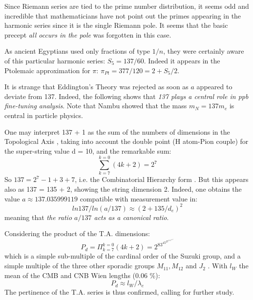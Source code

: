 \documentclass[twoside,draft]{article}
\begin{document}
\begin{sloppypar}
Since Riemann series are tied to the prime number distribution, it seems odd and incredible that mathematicians
have not point out the primes appearing in the harmonic series since it is the single Riemann pole. It seems
that the basic precept \textit{all occurs in the pole} was forgotten in this case. 

As ancient Egyptians used only fractions of type $1/n$, they were certainly aware of this particular harmonic series: 
$S_{5} = 137/60$. Indeed it appears in the Ptolemaic approximation for $\pi$: $\pi_{Pt} = 377/120 = 2 +  S_{5}/2$.

It is strange that Eddington's Theory was rejected as soon as $a$ appeared to deviate from 137. Indeed, the
following shows that \textit{137 plays a central role in ppb fine-tuning analysis}. Note that Nambu \cite{Nambu} showed that the mass $ m_N = 137m_e $ is central in particle physics.


One may interpret 137 + 1 as
the sum of the numbers of dimensions in the Topological Axis \cite{Sanchez1}, taking into account the double
point (H atom-Pion couple) for the super-string value d = 10, and the remarkable sum:
\begin{equation}
\sum_{k=7}^{k=0}(4 k + 2) = 2^{7}
\end{equation}
So $137 = 2^{7} - 1 + 3 + 7$, i.e. the Combinatorial Hierarchy form \cite{Sanchez1}. But this appears also as 137 = 135 + 2, showing the string dimension 2. Indeed, one obtains the value $a \approx 137.035999119$
compatible with measurement value in:
\begin{equation}
ln137/ln(a/137) \approx (2+135/d_{e})^{2}
\end{equation}
meaning that \textit{the ratio $a/137$ acts as a canonical ratio}. 

Considering the product of the T.A. dimensions:
\begin{equation}
P_d = \Pi_{k=7}^{k=0}(4 k + 2) = 2^83^45^27^111^113^1
\end{equation}
which is a simple sub-multiple of the cardinal order of the Suzuki group, and a simple multiple of the three other sporadic groups $M_{11}, M_{12}$ and $J_2$ \cite{Aschbacher}.
With $l_W$ the mean of the CMB and CNB Wien lengths (0.06 \%):
\begin{equation}
P_d \approx l_W / \lambda_e
\end{equation}
The pertinence of the T.A. series is thus confirmed, calling for further study.


\end{sloppypar}
\end{document}
